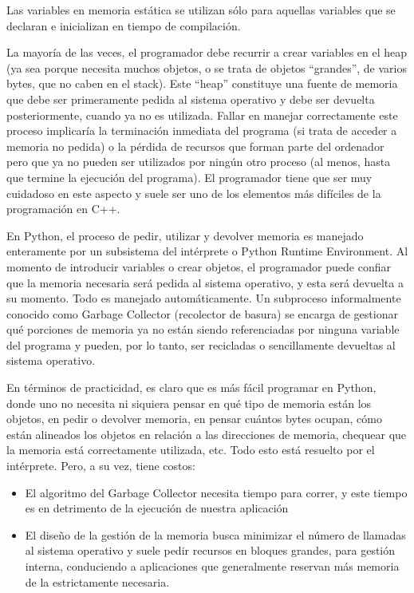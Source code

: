 Las variables en memoria estática se utilizan sólo para aquellas variables que
se declaran e inicializan en tiempo de compilación.

La mayoría de las veces, el programador debe recurrir a crear variables en el
heap (ya sea porque necesita muchos objetos, o se trata de objetos ``grandes'',
de varios bytes, que no caben en el stack). Este ``heap'' constituye una fuente
de memoria que debe ser primeramente pedida al sistema operativo y debe ser
devuelta posteriormente, cuando ya no es utilizada. Fallar en manejar
correctamente este proceso implicaría la terminación inmediata del programa (si
trata de acceder a memoria no pedida) o la pérdida de recursos que forman parte
del ordenador pero que ya no pueden ser utilizados por ningún otro proceso (al
menos, hasta que termine la ejecución del programa). El programador tiene que
ser muy cuidadoso en este aspecto y suele ser uno de los elementos más
difíciles de la programación en C++.

En Python, el proceso de pedir, utilizar y devolver memoria es manejado
enteramente por un subsistema del intérprete o Python Runtime Environment. Al
momento de introducir variables o crear objetos, el programador puede confiar
que la memoria necesaria será pedida al sistema operativo, y esta será devuelta
a su momento. Todo es manejado automáticamente. Un subproceso informalmente
conocido como Garbage Collector (recolector de basura) se encarga de gestionar
qué porciones de memoria ya no están siendo referenciadas por ninguna variable
del programa y pueden, por lo tanto, ser recicladas o sencillamente devueltas
al sistema operativo.

En términos de practicidad, es claro que es más fácil programar en Python,
donde uno no necesita ni siquiera pensar en qué tipo de memoria están los
objetos, en pedir o devolver memoria, en pensar cuántos bytes ocupan, cómo
están alineados los objetos en relación a las direcciones de memoria, chequear
que la memoria está correctamente utilizada, etc. Todo esto está resuelto por
el intérprete. Pero, a su vez, tiene costos:

\begin{itemize}
    \item El algoritmo del Garbage Collector necesita tiempo para correr, y
    este tiempo es en detrimento de la ejecución de nuestra aplicación

    \item El diseño de la gestión de la memoria busca minimizar el número de
    llamadas al sistema operativo y suele pedir recursos en bloques grandes,
    para gestión interna, conduciendo a aplicaciones que generalmente reservan
    más memoria de la estrictamente necesaria.
\end{itemize}


